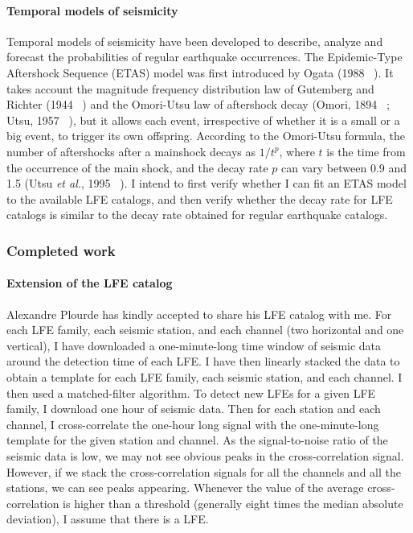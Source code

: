 \documentclass[letterpaper, 12pt]{article}
\begin{document}
\paragraph{Temporal models of seismicity} Temporal models of seismicity have been developed to describe, analyze and forecast the probabilities of regular earthquake occurrences. The Epidemic-Type Aftershock Sequence (ETAS) model was first introduced by Ogata (1988 ~\cite{OGA_1988}). It takes account the magnitude frequency distribution law of Gutemberg and Richter (1944 ~\cite{GUT_1944}) and the Omori-Utsu law of aftershock decay (Omori, 1894 ~\cite{OMO_1894}; Utsu, 1957 ~\cite{UTS_1957}), but it allows each event, irrespective of whether it is a small or a big event, to trigger its own offspring. According to the Omori-Utsu formula, the number of aftershocks after a mainshock decays as $1 / t^p$, where $t$ is the time from the occurrence of the main shock, and the decay rate $p$ can vary between 0.9 and 1.5 (Utsu \textit{et al.}, 1995 ~\cite{UTS_1995}). I intend to first verify whether I can fit an ETAS model to the available LFE catalogs, and then verify whether the decay rate for LFE catalogs is similar to the decay rate obtained for regular earthquake catalogs.

\subsubsection*{Completed work}

\paragraph{Extension of the LFE catalog} Alexandre Plourde has kindly accepted to share his LFE catalog with me. For each LFE family, each seismic station, and each channel (two horizontal and one vertical), I have downloaded a one-minute-long time window of seismic data around the detection time of each LFE. I have then linearly stacked the data to obtain a template for each LFE family, each seismic station, and each channel. I then used a matched-filter algorithm. To detect new LFEs for a given LFE family, I download one hour of seismic data. Then for each station and each channel, I cross-correlate the one-hour long signal with the one-minute-long template for the given station and channel. As the signal-to-noise ratio of the seismic data is low, we may not see obvious peaks in the cross-correlation signal. However, if we stack the cross-correlation signals for all the channels and all the stations, we can see peaks appearing. Whenever the value of the average cross-correlation is higher than a threshold (generally eight times the median absolute deviation), I assume that there is a LFE. \\
\end{document}
